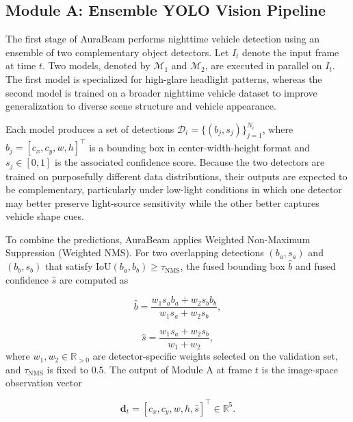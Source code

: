 \documentclass[pdflatex,sn-mathphys-num]{sn-jnl}%
\theoremstyle{thmstyleone}%
\theoremstyle{thmstyletwo}%
\theoremstyle{thmstylethree}%
\begin{document}
\subsection{Module A: Ensemble YOLO Vision Pipeline}
\label{subsec:yolo}

The first stage of AuraBeam performs nighttime vehicle detection using an ensemble of two complementary object detectors. Let $I_t$ denote the input frame at time $t$. Two models, denoted by $\mathcal{M}_1$ and $\mathcal{M}_2$, are executed in parallel on $I_t$. The first model is specialized for high-glare headlight patterns, whereas the second model is trained on a broader nighttime vehicle dataset to improve generalization to diverse scene structure and vehicle appearance.

Each model produces a set of detections $\mathcal{D}_i = \{(b_j, s_j)\}_{j=1}^{N_i}$, where $b_j = [c_x, c_y, w, h]^\top$ is a bounding box in center-width-height format and $s_j \in [0,1]$ is the associated confidence score. Because the two detectors are trained on purposefully different data distributions, their outputs are expected to be complementary, particularly under low-light conditions in which one detector may better preserve light-source sensitivity while the other better captures vehicle shape cues.

To combine the predictions, AuraBeam applies Weighted Non-Maximum Suppression (Weighted NMS). For two overlapping detections $(b_a, s_a)$ and $(b_b, s_b)$ that satisfy $\mathrm{IoU}(b_a, b_b) \geq \tau_{\mathrm{NMS}}$, the fused bounding box $\hat{b}$ and fused confidence $\hat{s}$ are computed as

\begin{equation}
\hat{b} = \frac{w_1 s_a b_a + w_2 s_b b_b}{w_1 s_a + w_2 s_b},
\label{eq:nms_box}
\end{equation}

\begin{equation}
\hat{s} = \frac{w_1 s_a + w_2 s_b}{w_1 + w_2},
\label{eq:nms_score}
\end{equation}
where $w_1, w_2 \in \mathbb{R}_{>0}$ are detector-specific weights selected on the validation set, and $\tau_{\mathrm{NMS}}$ is fixed to $0.5$. The output of Module A at frame $t$ is the image-space observation vector

\begin{equation}
\mathbf{d}_t = [c_x, c_y, w, h, \hat{s}]^\top \in \mathbb{R}^5.
\label{eq:det_vec}
\end{equation}
\end{document}
